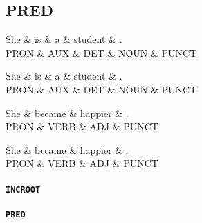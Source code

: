 \subsection{PRED}
\begin{dependency}
	\begin{deptext}
	She \& is \& a \& student \& .\\
	PRON \& AUX \& DET \& NOUN \& PUNCT\\
	\end{deptext}
\end{dependency}

\begin{dependency}
	\begin{deptext}
	She \& is \& a \& student \& .\\
	PRON \& AUX \& DET \& NOUN \& PUNCT\\
	\end{deptext}
\end{dependency}

\begin{dependency}
	\begin{deptext}
	She \& became \& happier \& .\\
	PRON \& VERB \& ADJ \& PUNCT\\
	\end{deptext}
\end{dependency}

\begin{dependency}
	\begin{deptext}
	She \& became \& happier \& .\\
	PRON \& VERB \& ADJ \& PUNCT\\
	\end{deptext}
\end{dependency}

\paragraph{\texttt{INCROOT}}

\paragraph{\texttt{PRED}}


